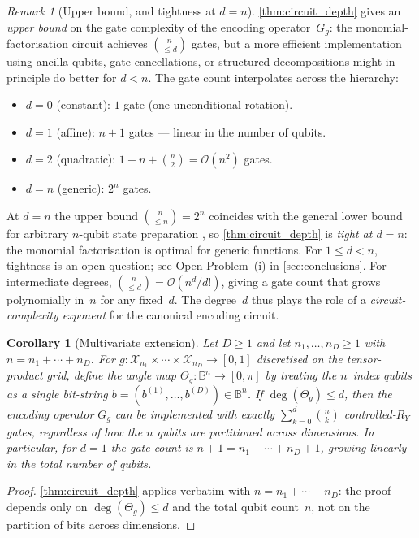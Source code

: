 \documentclass[12pt,a4paper]{article}
\theoremstyle{plain}
\newtheorem{corollary}[corollary]{Corollary}
\theoremstyle{definition}
\theoremstyle{remark}
\newtheorem{remark}[remark]{Remark}
\newcommand{\Thetag}{\Theta_g}
\begin{document}
\begin{remark}[Upper bound, and tightness at $d=n$]
\label{rem:interpolation}
\cref{thm:circuit_depth} gives an \emph{upper bound} on the gate
complexity of the encoding operator~$G_g$: the monomial-factorisation
circuit achieves $\binom{n}{\leq d}$ gates, but a more efficient
implementation using ancilla qubits, gate cancellations, or structured
decompositions might in principle do better for $d < n$.
The gate count interpolates across the hierarchy:
\begin{itemize}
  \item $d=0$ (constant): $1$ gate (one unconditional rotation).
  \item $d=1$ (affine): $n+1$ gates — linear in the number of qubits.
  \item $d=2$ (quadratic): $1 + n + \binom{n}{2} = \mathcal{O}(n^2)$ gates.
  \item $d=n$ (generic): $2^n$ gates.
\end{itemize}
At $d=n$ the upper bound $\binom{n}{\leq n}=2^n$ coincides with the
general lower bound for arbitrary $n$-qubit state preparation
\cite{ShendeBullockMarkov2006}, so \cref{thm:circuit_depth} is
\emph{tight at $d=n$}: the monomial factorisation is optimal for
generic functions.
For $1\leq d < n$, tightness is an open question; see
Open Problem~(i) in \cref{sec:conclusions}.
For intermediate degrees, $\binom{n}{\leq d}=\mathcal{O}(n^d/d!)$,
giving a gate count that grows polynomially in~$n$ for any fixed~$d$.
The degree~$d$ thus plays the role of a \emph{circuit-complexity
exponent} for the canonical encoding circuit.
\end{remark}

\begin{corollary}[Multivariate extension]
\label{cor:multivariate}
Let $D\geq 1$ and let $n_1,\ldots,n_D\geq 1$ with $n=n_1+\cdots+n_D$.
For $g:\mathcal{X}_{n_1}\times\cdots\times\mathcal{X}_{n_D}\to[0,1]$
discretised on the tensor-product grid, define the angle map
$\Thetag:\mathbb{B}^n\to[0,\pi]$ by treating the $n$~index qubits as
a single bit-string $b=(b^{(1)},\ldots,b^{(D)})\in\mathbb{B}^n$.
If $\deg(\Thetag)\leq d$, then the encoding operator $G_g$ can be
implemented with exactly $\sum_{k=0}^{d}\binom{n}{k}$ controlled-$R_Y$
gates, regardless of how the $n$ qubits are partitioned across
dimensions.
In particular, for $d=1$ the gate count is $n+1=n_1+\cdots+n_D+1$,
growing linearly in the total number of qubits.
\end{corollary}

\begin{proof}
\cref{thm:circuit_depth} applies verbatim with $n=n_1+\cdots+n_D$:
the proof depends only on $\deg(\Thetag)\leq d$ and the total qubit
count~$n$, not on the partition of bits across dimensions.
\end{proof}
\end{document}
